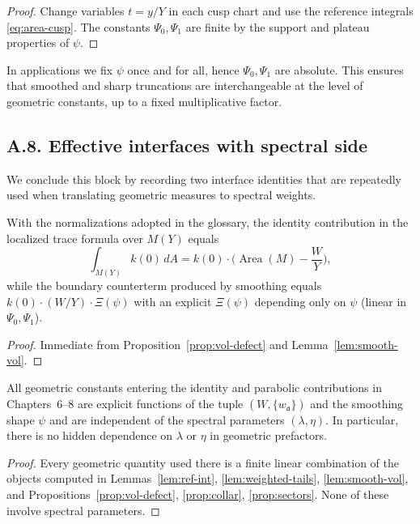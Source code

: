 \begin{proof}
Change variables $t=y/Y$ in each cusp chart and use the reference integrals
\eqref{eq:area-cusp}. The constants $\Psi_0,\Psi_1$ are finite by the support
and plateau properties of $\psi$.
\end{proof}

\begin{remark}
In applications we fix $\psi$ once and for all, hence $\Psi_0,\Psi_1$ are absolute.
This ensures that smoothed and sharp truncations are interchangeable at the level
of geometric constants, up to a fixed multiplicative factor.
\end{remark}

\subsection*{A.8. Effective interfaces with spectral side}

\noindent
We conclude this block by recording two interface identities that are repeatedly
used when translating geometric measures to spectral weights.

\begin{lemma}\label{lem:plancherel}
With the normalizations adopted in the glossary, the identity contribution in
the localized trace formula over $M(Y)$ equals
\[
\int_{M(Y)} k(0)\,dA
= k(0)\cdot \Big(\operatorname{Area}(M)- \frac{W}{Y}\Big),
\]
while the boundary counterterm produced by smoothing equals
$k(0)\cdot (W/Y)\cdot \Xi(\psi)$ with an explicit $\Xi(\psi)$ depending only on
$\psi$ (linear in $\Psi_0,\Psi_1$).
\end{lemma}

\begin{proof}
Immediate from Proposition~\ref{prop:vol-defect} and Lemma~\ref{lem:smooth-vol}.
\end{proof}

\begin{proposition}\label{prop:uniform-geom}
All geometric constants entering the identity and parabolic contributions in
Chapters~6–8 are explicit functions of the tuple
$(W,\{w_{\mathfrak a}\})$ and the smoothing shape $\psi$ and are independent of
the spectral parameters $(\lambda,\eta)$. In particular, there is no hidden
dependence on $\lambda$ or $\eta$ in geometric prefactors.
\end{proposition}

\begin{proof}
Every geometric quantity used there is a finite linear combination of the
objects computed in Lemmas~\ref{lem:ref-int}, \ref{lem:weighted-tails},
\ref{lem:smooth-vol}, and Propositions~\ref{prop:vol-defect}, \ref{prop:collar},
\ref{prop:sectors}. None of these involve spectral parameters.
\end{proof}

